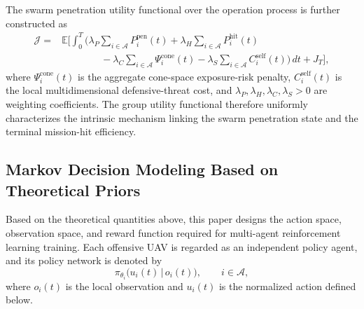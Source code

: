 \documentclass{cja}
\begin{document}
The swarm penetration utility functional over the operation process is further constructed as
\begin{equation}
\begin{aligned}
\mathcal J
={}&
\mathbb E\Biggl[
\int_0^T
\Biggl(
\lambda_P \sum_{i\in\mathcal{A}} P_i^{\mathrm{pen}}(t)
+
\lambda_H \sum_{i\in\mathcal{A}} P_i^{\mathrm{hit}}(t)\\
&\qquad\qquad
-
\lambda_C \sum_{i\in\mathcal{A}} \Psi_i^{\mathrm{cone}}(t)
-
\lambda_S \sum_{i\in\mathcal{A}} C_i^{\mathrm{self}}(t)
\Biggr)\,dt
+
J_T
\Biggr],
\end{aligned}
\end{equation}
where $\Psi_i^{\mathrm{cone}}(t)$ is the aggregate cone-space exposure-risk penalty, $C_i^{\mathrm{self}}(t)$ is the local multidimensional defensive-threat cost, and $\lambda_P,\lambda_H,\lambda_C,\lambda_S>0$ are weighting coefficients. The group utility functional therefore uniformly characterizes the intrinsic mechanism linking the swarm penetration state and the terminal mission-hit efficiency.

\subsection{Markov Decision Modeling Based on Theoretical Priors}
\label{subsec:rl-design}

Based on the theoretical quantities above, this paper designs the action space, observation space, and reward function required for multi-agent reinforcement learning training. Each offensive UAV is regarded as an independent policy agent, and its policy network is denoted by
\begin{equation}
\pi_{\theta_i}\bigl(u_i(t)\,\big|\,o_i(t)\bigr),\qquad i\in\mathcal{A},
\end{equation}
where $o_i(t)$ is the local observation and $u_i(t)$ is the normalized action defined below.
\end{document}
